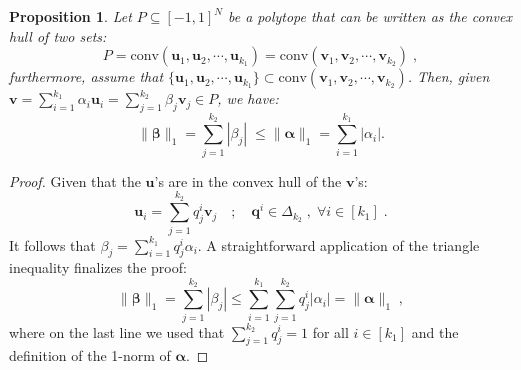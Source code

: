 \documentclass[10pt,aps,pra,twocolumn,floatfix,nofootinbib,superscriptaddress,longbibliography]{revtex4-2}
\newcommand{\1}{\mathbbm{1}}
\newtheorem{prop}[thm]{Proposition}
\begin{document}
\begin{prop}
    Let $P \subseteq [-1,1]^N$ be a polytope that can be written as the convex hull of two sets:
    \begin{equation}
        P = \mathrm{conv}(\mathbf {u}_1, \mathbf {u}_2, \cdots, \mathbf {u}_{k_1}) = \mathrm{conv}(\mathbf {v}_1, \mathbf {v}_2, \cdots, \mathbf {v}_{k_2})\;,
    \end{equation}
    furthermore, assume that $\{\mathbf {u}_1, \mathbf {u}_2, \cdots, \mathbf {u}_{k_1}\}\subset \mathrm{conv}(\mathbf {v}_1, \mathbf {v}_2, \cdots, \mathbf{v}_{k_2})$. Then, given $\mathbf v = \sum_{i=1}^{k_1}\alpha_i \mathbf u_i = \sum_{j=1}^{k_2}\beta_j \mathbf v_j \in P$, we have:
    \begin{equation}
        \|\boldsymbol{\beta}\|_1=\sum_{j=1}^{k_2}|\beta_j|\; \leq \|\boldsymbol{\alpha}\|_1=\sum_{i=1}^{k_1}|\alpha_i|.
    \end{equation}
    \label{prop:1norminequality}
\end{prop}
\begin{proof}
Given that the $\mathbf u$'s are in the convex hull of the $\mathbf v$'s:
\begin{equation}
    \mathbf {u}_i = \sum_{j=1}^{k_2}q^i_j\mathbf{v}_j \quad ;\quad \mathbf q^i \in \Delta_{k_2} \;,\;\forall i \in [k_1]\;.
\end{equation}
It follows that $\beta_j = \sum_{i=1}^{k_1} q^i_j \alpha_i$. A straightforward application of the triangle inequality finalizes the proof:
\begin{equation}
    \|\boldsymbol{\beta}\|_1 = \sum_{j=1}^{k_2}|\beta_j| \leq \sum_{i=1}^{k_1}\sum_{j=1}^{k_2} q^i_j |\alpha_i| =\|\boldsymbol{\alpha}\|_1\;,
\end{equation}
where on the last line we used that $\sum_{j=1}^{k_2}q^i_j=1$ for all $i \in [k_1]$ and the definition of the 1-norm of $\boldsymbol{\alpha}.$
\end{proof}
\end{document}
